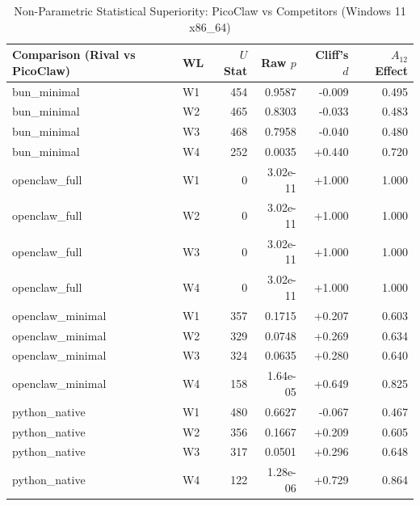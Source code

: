 \begin{table}[t]
\centering\small
\caption{Non-Parametric Statistical Superiority: PicoClaw vs Competitors (Windows 11 x86_64)}
\label{tab:Windows_stat_tests}
\begin{tabular}{llrrrr}
\toprule
Comparison (Rival vs PicoClaw) & WL & $U$ Stat & Raw $p$ & Cliff's $d$ & $A_{12}$ Effect \\
\midrule
bun\_minimal & W1 & 454 & 0.9587 & -0.009 & 0.495 \\
bun\_minimal & W2 & 465 & 0.8303 & -0.033 & 0.483 \\
bun\_minimal & W3 & 468 & 0.7958 & -0.040 & 0.480 \\
bun\_minimal & W4 & 252 & 0.0035 & +0.440 & 0.720 \\
openclaw\_full & W1 & 0 & 3.02e-11 & +1.000 & 1.000 \\
openclaw\_full & W2 & 0 & 3.02e-11 & +1.000 & 1.000 \\
openclaw\_full & W3 & 0 & 3.02e-11 & +1.000 & 1.000 \\
openclaw\_full & W4 & 0 & 3.02e-11 & +1.000 & 1.000 \\
openclaw\_minimal & W1 & 357 & 0.1715 & +0.207 & 0.603 \\
openclaw\_minimal & W2 & 329 & 0.0748 & +0.269 & 0.634 \\
openclaw\_minimal & W3 & 324 & 0.0635 & +0.280 & 0.640 \\
openclaw\_minimal & W4 & 158 & 1.64e-05 & +0.649 & 0.825 \\
python\_native & W1 & 480 & 0.6627 & -0.067 & 0.467 \\
python\_native & W2 & 356 & 0.1667 & +0.209 & 0.605 \\
python\_native & W3 & 317 & 0.0501 & +0.296 & 0.648 \\
python\_native & W4 & 122 & 1.28e-06 & +0.729 & 0.864 \\
\bottomrule
\end{tabular}
\end{table}
